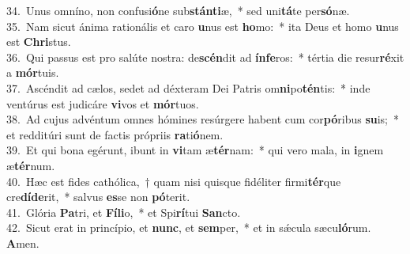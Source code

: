 {34.~}Unus omníno, non confusi\textbf{ó}ne sub\textbf{stán}\textbf{ti}æ,~* sed uni\textbf{tá}te per\textbf{só}næ.\\
{35.~}Nam sicut ánima rationális et caro \textbf{u}nus est \textbf{ho}mo:~* ita Deus et homo \textbf{u}nus est \textbf{Chri}stus.\\
{36.~}Qui passus est pro salúte nostra: de\textbf{scén}dit ad \textbf{ín}\textbf{fe}ros:~* tértia die resur\textbf{ré}xit a \textbf{mór}tuis.\\
{37.~}Ascéndit ad cælos, sedet ad déxteram Dei Patris om\textbf{ni}po\textbf{tén}tis:~* inde ventúrus est judicáre \textbf{vi}vos et \textbf{mór}tuos.\\
{38.~}Ad cujus advéntum omnes hómines resúrgere habent cum cor\textbf{pó}ribus \textbf{su}is;~* et redditúri sunt de factis própriis \textbf{ra}ti\textbf{ó}nem.\\
{39.~}Et qui bona egérunt, ibunt in \textbf{vi}tam æ\textbf{tér}nam:~* qui vero mala, in \textbf{i}gnem æ\textbf{tér}num.\\
{40.~}Hæc est fides cathólica,~† quam nisi quisque fidéliter firmi\textbf{tér}que cre\textbf{dí}\textbf{de}rit,~* salvus \textbf{es}se non \textbf{pó}terit.\\
{41.~}Glória \textbf{Pa}tri, et \textbf{Fí}\textbf{li}o,~* et Spi\textbf{rí}tui \textbf{San}cto.\\
{42.~}Sicut erat in princípio, et \textbf{nunc}, et \textbf{sem}per,~* et in sǽcula sæcu\textbf{ló}rum. \textbf{A}men.\\
